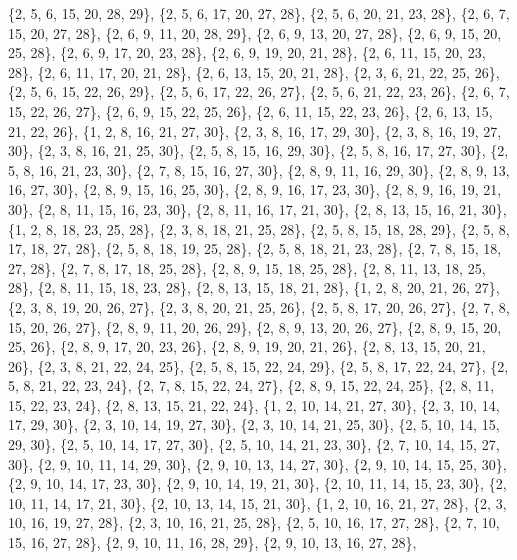 \documentclass[11pt,a4paper]{article}
\begin{document}
{\{2, 5, 6, 15, 20, 28, 29\}, \{2, 5, 6, 17, 20, 27, 28\}, \{2, 5, 6, 20, 21, 23, 28\}, \{2, 6, 7, 15, 20, 27, 28\}, \{2, 6, 9, 11, 20, 28, 29\},
\{2, 6, 9, 13, 20, 27, 28\}, \{2, 6, 9, 15, 20, 25, 28\}, \{2, 6, 9, 17, 20, 23, 28\}, \{2, 6, 9, 19, 20, 21, 28\}, \{2, 6, 11, 15, 20, 23, 28\},
\{2, 6, 11, 17, 20, 21, 28\}, \{2, 6, 13, 15, 20, 21, 28\}, \{2, 3, 6, 21, 22, 25, 26\}, \{2, 5, 6, 15, 22, 26, 29\}, \{2, 5, 6, 17, 22, 26, 27\},
\{2, 5, 6, 21, 22, 23, 26\}, \{2, 6, 7, 15, 22, 26, 27\}, \{2, 6, 9, 15, 22, 25, 26\}, \{2, 6, 11, 15, 22, 23, 26\}, \{2, 6, 13, 15, 21, 22, 26\},
\{1, 2, 8, 16, 21, 27, 30\}, \{2, 3, 8, 16, 17, 29, 30\}, \{2, 3, 8, 16, 19, 27, 30\}, \{2, 3, 8, 16, 21, 25, 30\}, \{2, 5, 8, 15, 16, 29, 30\},
\{2, 5, 8, 16, 17, 27, 30\}, \{2, 5, 8, 16, 21, 23, 30\}, \{2, 7, 8, 15, 16, 27, 30\}, \{2, 8, 9, 11, 16, 29, 30\}, \{2, 8, 9, 13, 16, 27, 30\},
\{2, 8, 9, 15, 16, 25, 30\}, \{2, 8, 9, 16, 17, 23, 30\}, \{2, 8, 9, 16, 19, 21, 30\}, \{2, 8, 11, 15, 16, 23, 30\}, \{2, 8, 11, 16, 17, 21, 30\},
\{2, 8, 13, 15, 16, 21, 30\}, \{1, 2, 8, 18, 23, 25, 28\}, \{2, 3, 8, 18, 21, 25, 28\}, \{2, 5, 8, 15, 18, 28, 29\}, \{2, 5, 8, 17, 18, 27, 28\},
\{2, 5, 8, 18, 19, 25, 28\}, \{2, 5, 8, 18, 21, 23, 28\}, \{2, 7, 8, 15, 18, 27, 28\}, \{2, 7, 8, 17, 18, 25, 28\}, \{2, 8, 9, 15, 18, 25, 28\},
\{2, 8, 11, 13, 18, 25, 28\}, \{2, 8, 11, 15, 18, 23, 28\}, \{2, 8, 13, 15, 18, 21, 28\}, \{1, 2, 8, 20, 21, 26, 27\}, \{2, 3, 8, 19, 20, 26, 27\},
\{2, 3, 8, 20, 21, 25, 26\}, \{2, 5, 8, 17, 20, 26, 27\}, \{2, 7, 8, 15, 20, 26, 27\}, \{2, 8, 9, 11, 20, 26, 29\}, \{2, 8, 9, 13, 20, 26, 27\},
\{2, 8, 9, 15, 20, 25, 26\}, \{2, 8, 9, 17, 20, 23, 26\}, \{2, 8, 9, 19, 20, 21, 26\}, \{2, 8, 13, 15, 20, 21, 26\}, \{2, 3, 8, 21, 22, 24, 25\},
\{2, 5, 8, 15, 22, 24, 29\}, \{2, 5, 8, 17, 22, 24, 27\}, \{2, 5, 8, 21, 22, 23, 24\}, \{2, 7, 8, 15, 22, 24, 27\}, \{2, 8, 9, 15, 22, 24, 25\},
\{2, 8, 11, 15, 22, 23, 24\}, \{2, 8, 13, 15, 21, 22, 24\}, \{1, 2, 10, 14, 21, 27, 30\}, \{2, 3, 10, 14, 17, 29, 30\}, \{2, 3, 10, 14, 19, 27, 30\},
\{2, 3, 10, 14, 21, 25, 30\}, \{2, 5, 10, 14, 15, 29, 30\}, \{2, 5, 10, 14, 17, 27, 30\}, \{2, 5, 10, 14, 21, 23, 30\}, \{2, 7, 10, 14, 15, 27, 30\},
\{2, 9, 10, 11, 14, 29, 30\}, \{2, 9, 10, 13, 14, 27, 30\}, \{2, 9, 10, 14, 15, 25, 30\}, \{2, 9, 10, 14, 17, 23, 30\}, \{2, 9, 10, 14, 19, 21, 30\},
\{2, 10, 11, 14, 15, 23, 30\}, \{2, 10, 11, 14, 17, 21, 30\}, \{2, 10, 13, 14, 15, 21, 30\}, \{1, 2, 10, 16, 21, 27, 28\}, \{2, 3, 10, 16, 19, 27, 28\},
\{2, 3, 10, 16, 21, 25, 28\}, \{2, 5, 10, 16, 17, 27, 28\}, \{2, 7, 10, 15, 16, 27, 28\}, \{2, 9, 10, 11, 16, 28, 29\}, \{2, 9, 10, 13, 16, 27, 28\},
}
\end{document}
